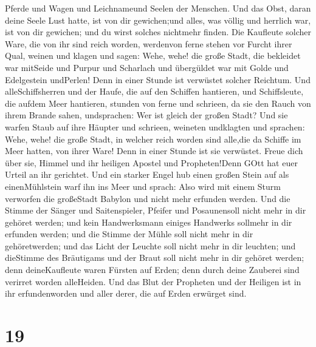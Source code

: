 Pferde und Wagen und Leichnameund Seelen der Menschen.  Und
das Obst, daran deine Seele Lust hatte, ist von dir gewichen;und alles,
was völlig und herrlich war, ist von dir gewichen; und du wirst solches
nichtmehr finden.  Die Kaufleute solcher Ware, die von ihr
sind reich worden, werdenvon ferne stehen vor Furcht ihrer Qual, weinen
und klagen  und sagen: Wehe, wehe! die große Stadt, die
bekleidet war mitSeide und Purpur und Scharlach und übergüldet war mit
Golde und Edelgestein undPerlen!  Denn in einer Stunde ist
verwüstet solcher Reichtum. Und alleSchiffsherren und der Haufe, die auf
den Schiffen hantieren, und Schiffsleute, die aufdem Meer hantieren,
stunden von ferne  und schrieen, da sie den Rauch von ihrem
Brande sahen, undsprachen: Wer ist gleich der großen Stadt?
 Und sie warfen Staub auf ihre Häupter und schrieen,
weineten undklagten und sprachen: Wehe, wehe! die große Stadt, in
welcher reich worden sind alle,die da Schiffe im Meer hatten, von ihrer
Ware! Denn in einer Stunde ist sie verwüstet.  Freue dich
über sie, Himmel und ihr heiligen Apostel und Propheten!Denn GOtt hat
euer Urteil an ihr gerichtet.  Und ein starker Engel hub
einen großen Stein auf als einenMühlstein warf ihn ins Meer und sprach:
Also wird mit einem Sturm verworfen die großeStadt Babylon und nicht
mehr erfunden werden.  Und die Stimme der Sänger und
Saitenspieler, Pfeifer und Posaunensoll nicht mehr in dir gehöret
werden; und kein Handwerksmann einiges Handwerks sollmehr in dir
erfunden werden; und die Stimme der Mühle soll nicht mehr in dir
gehöretwerden;  und das Licht der Leuchte soll nicht mehr
in dir leuchten; und dieStimme des Bräutigams und der Braut soll nicht
mehr in dir gehöret werden; denn deineKaufleute waren Fürsten auf Erden;
denn durch deine Zauberei sind verirret worden alleHeiden. 
Und das Blut der Propheten und der Heiligen ist in ihr erfundenworden
und aller derer, die auf Erden erwürget sind.

\hypertarget{section-17}{%
\section{19}\label{section-17}}


